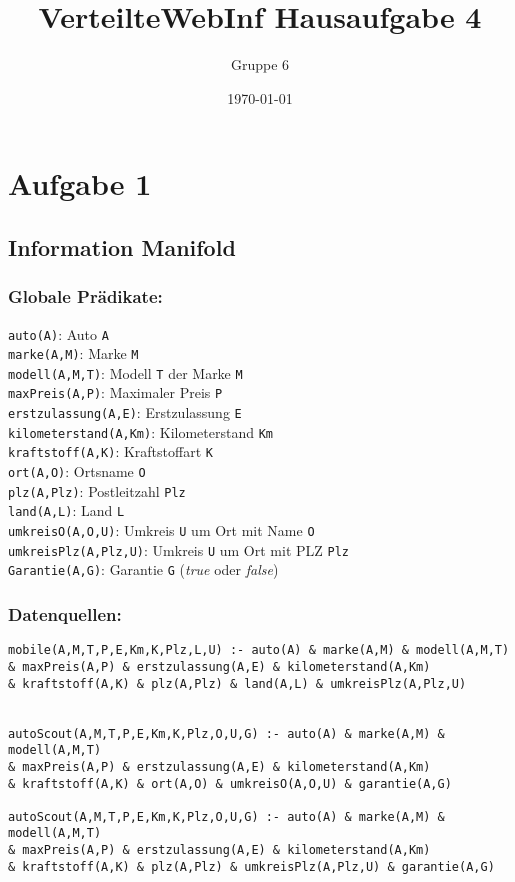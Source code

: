 \documentclass[a4paper]{article}
\author{Gruppe 6}
\title{\textbf{VerteilteWebInf Hausaufgabe 4}}
\date{\today}
\begin{document}
\maketitle


\section*{Aufgabe 1}


\subsection*{Information Manifold}
\subsubsection*{Globale Prädikate:}
\texttt{auto(A)}: Auto \texttt{A}\\
\texttt{marke(A,M)}: Marke \texttt{M} \\
\texttt{modell(A,M,T)}: Modell \texttt{T} der Marke \texttt{M}\\
\texttt{maxPreis(A,P)}: Maximaler Preis \texttt{P} \\
\texttt{erstzulassung(A,E)}: Erstzulassung \texttt{E} \\
\texttt{kilometerstand(A,Km)}: Kilometerstand \texttt{Km}\\
\texttt{kraftstoff(A,K)}: Kraftstoffart \texttt{K}\\
\texttt{ort(A,O)}: Ortsname \texttt{O}\\
\texttt{plz(A,Plz)}: Postleitzahl \texttt{Plz}\\
\texttt{land(A,L)}: Land \texttt{L}\\
\texttt{umkreisO(A,O,U)}: Umkreis \texttt{U} um Ort mit Name \texttt{O}\\
\texttt{umkreisPlz(A,Plz,U)}: Umkreis \texttt{U} um Ort mit PLZ \texttt{Plz} \\
\texttt{Garantie(A,G)}: Garantie \texttt{G} (\emph{true} oder \emph{false})\\

\subsubsection*{Datenquellen:}
\begin{verbatim}
mobile(A,M,T,P,E,Km,K,Plz,L,U) :- auto(A) & marke(A,M) & modell(A,M,T) 
& maxPreis(A,P) & erstzulassung(A,E) & kilometerstand(A,Km) 
& kraftstoff(A,K) & plz(A,Plz) & land(A,L) & umkreisPlz(A,Plz,U)


autoScout(A,M,T,P,E,Km,K,Plz,O,U,G) :- auto(A) & marke(A,M) & modell(A,M,T) 
& maxPreis(A,P) & erstzulassung(A,E) & kilometerstand(A,Km) 
& kraftstoff(A,K) & ort(A,O) & umkreisO(A,O,U) & garantie(A,G)

autoScout(A,M,T,P,E,Km,K,Plz,O,U,G) :- auto(A) & marke(A,M) & modell(A,M,T) 
& maxPreis(A,P) & erstzulassung(A,E) & kilometerstand(A,Km) 
& kraftstoff(A,K) & plz(A,Plz) & umkreisPlz(A,Plz,U) & garantie(A,G)
\end{verbatim}
\end{document}
